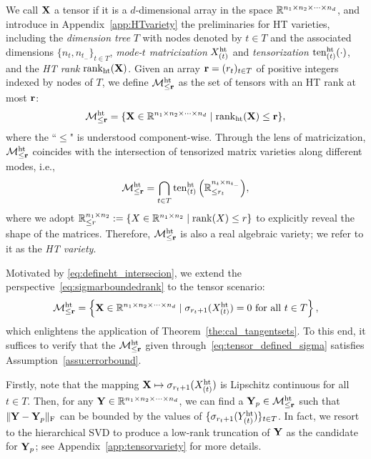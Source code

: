 We call $\mathbf{X}$ a tensor if it is a $d$-dimensional array in the space $\mathbb{R}^{n_1\times n_2\times\cdots\times n_d}$, and introduce in Appendix~\ref{app:HTvariety} the preliminaries for HT varieties, including the \emph{dimension tree} $T$ with nodes denoted by $t\in T$ and the associated dimensions $\{n_t,n_{t_-}\}_{t\in T}$, \emph{mode-$t$ matricization} $X_{(t)}^{\mathrm{ht}}$ and \emph{tensorization} $\mathrm{ten}^{\mathrm{ht}}_{(t)}(\cdot)$, and the \emph{HT rank} $\mathrm{rank}_{\mathrm{ht}}(\mathbf{X})$. Given an array $\mathbf{r}=(r_t)_{t\in T}$ of positive integers indexed by nodes of $T$, we define $\mathcal{M}^{\mathrm{ht}}_{\le \mathbf{r}}$ as the set of tensors with an HT rank at most $\mathbf{r}$:
\begin{equation}\label{eq:httensor}
    \mathcal{M}^{\mathrm{ht}}_{\le \mathbf{r}} = \{\mathbf{X}\in\mathbb{R}^{n_1\times n_2\times\cdots\times n_d} \mid \mathrm{rank}_{\mathrm{ht}}(\mathbf{X})\le\mathbf{r}\},
\end{equation}
where the ``$\le$" is understood component-wise. Through the lens of matricization, $\mathcal{M}^{\mathrm{ht}}_{\le \mathbf{r}}$ coincides with the intersection of tensorized matrix varieties along different modes, i.e.,
\begin{equation}\label{eq:defineht_intersecion}
    \mathcal{M}_{\le\mathbf{r}}^{\mathrm{ht}} =  \bigcap_{t\in T}{\mathrm{ten}_{(t)}^{\mathrm{ht}}\left( {\mathbb{R}^{n_t\times n_{t_-}}_{\le r_t}} \right)},
\end{equation}
where we adopt $\mathbb{R}^{n_1\times n_2}_{\le r}:=\{X\in\mathbb{R}^{n_1\times n_2}\mid \operatorname{rank}(X)\le r\}$ to explicitly reveal the shape of the matrices. Therefore, $\mathcal{M}^{\mathrm{ht}}_{\le \mathbf{r}}$ is also a real algebraic variety; we refer to it as the \emph{HT variety}.

Motivated by \eqref{eq:defineht_intersecion}, we extend the perspective~\eqref{eq:sigmarboundedrank} to the tensor scenario:
\begin{equation}\label{eq:tensor_defined_sigma}
    \mathcal{M}_{\le\mathbf{r}}^{\mathrm{ht}} = \left\{ {\mathbf{X}\in\mathbb{R}^{n_1\times n_2\times\cdots\times n_d} \mid \sigma_{r_t+1}(X^{\mathrm{ht}}_{(t)})=0\ \text{for all}\ t\in T} \right\},
\end{equation}
which enlightens the application of Theorem~\ref{the:cal_tangentsets}. To this end, it suffices to verify that the $\mathcal{M}_{\le \mathbf{r}}^{\mathrm{ht}}$ given through~\eqref{eq:tensor_defined_sigma} satisfies Assumption~\ref{assu:errorbound}. 

Firstly, note that the mapping $\mathbf{X}\mapsto\sigma_{r_t+1}(X^{\mathrm{ht}}_{(t)})$ is Lipschitz continuous for all $t\in T$. Then, for any $\mathbf{Y}\in\mathbb{R}^{n_1\times n_2\times\cdots\times n_d}$, we can find a $\mathbf{Y}_p\in\mathcal{M}_{\le \mathbf{r}}^{\mathrm{ht}}$ such that $\|\mathbf{Y}-\mathbf{Y}_p\|_{\mathrm{F}}$ can be bounded by the values of $\{\sigma_{r_t+1}(Y^{\mathrm{ht}}_{(t)})\}_{t\in T}$. In fact, we resort to the hierarchical SVD \cite{grasedyck2010hierarchicalSVD} to produce a low-rank truncation of $\mathbf{Y}$ as the candidate for $\mathbf{Y}_p$; see Appendix~\ref{app:tensorvariety} for more details. 

